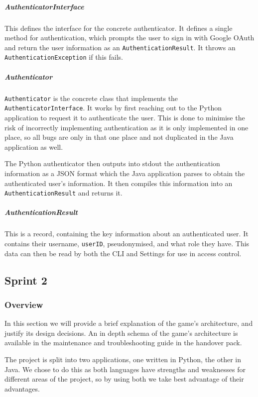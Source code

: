 \subparagraph{AuthenticatorInterface}
This defines the interface for the concrete authenticator. It defines a single method for authentication, which prompts the user to sign in with Google OAuth and return the user information as an \texttt{AuthenticationResult}. It throws an \texttt{AuthenticationException} if this fails.

\subparagraph{Authenticator}
\texttt{Authenticator} is the concrete class that implements the \texttt{AuthenticatorInterface}. It works by first reaching out to the Python application to request it to authenticate the user. This is done to minimise the risk of incorrectly implementing authentication as it is only implemented in one place, so all bugs are only in that one place and not duplicated in the Java application as well.

The Python authenticator then outputs into stdout the authentication information as a JSON format which the Java application parses to obtain the authenticated user's information. It then compiles this information into an \texttt{AuthenticationResult} and returns it.

\subparagraph{AuthenticationResult}
This is a record, containing the key information about an authenticated user. It contains their username, \texttt{userID}, pseudonymised, and what role they have. This data can then be read by both the CLI and Settings for use in access control.


\subsection{Sprint 2}

\subsubsection{Overview}
In this section we will provide a brief explanation of the game's architecture, and justify its design decisions. An in depth schema of the game's architecture is available in the maintenance and troubleshooting guide in the handover pack.

The project is split into two applications, one written in Python, the other in Java. We chose to do this as both languages have strengths and weaknesses for different areas of the project, so by using both we take best advantage of their advantages.

